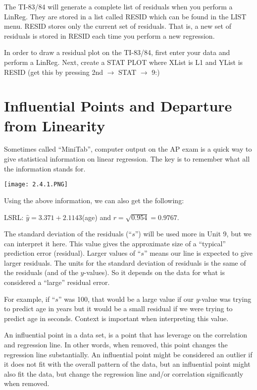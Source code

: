 \documentclass[../stats.tex]{subfiles}
\begin{document}
The TI-83/84 will generate a complete list of residuals when you perform a LinReg. They are stored in a list called RESID which can be found in the LIST menu. RESID stores only the current set 
of residuals. That is, a new set of residuals is stored in RESID each time you perform a new regression.

In order to draw a residual plot on the TI-83/84, first enter your data and perform a LinReg. Next, create a STAT PLOT where XList is L1 and YList is RESID (get this by pressing 2nd $\rightarrow$ STAT $\rightarrow$ 9:)
\section{Influential Points and Departure from Linearity}
Sometimes called ``MiniTab'', computer output on the AP exam is a quick way to give statistical information on linear regression. The key is to remember what all the information stands for.
\begin{center}
    \texttt{[image: 2.4.1.PNG]}
\end{center}
Using the above information, we can also get the following:

LSRL: $\hat{y}=3.371+2.1143$(age) and $r=\sqrt{0.954}=0.9767$.

The standard deviation of the residuals (``$s$'') will be used more in Unit 9, but we can interpret it here. This value gives the approximate size of a ``typical'' prediction error (residual). Larger values of 
``$s$'' means our line is expected to give larger residuals. The units for the standard deviation of residuals is the same of the residuals (and of the $y$-values). So it depends on the data for what is considered a ``large'' residual error.

For example, if ``$s$'' was 100, that would be a large value if our $y$-value was trying to predict age in years but it would be a small residual if we were trying to predict age in seconds. Context is important when interpreting this value.

An influential point in a data set, is a point that has leverage on the correlation and regression line. In other words, when removed, this point changes the regression line substantially. 
An influential point might be considered an outlier if it does not fit with the overall pattern of the data, but an influential point might also fit the data, but change the regression line and/or correlation significantly when removed.
\end{document}
